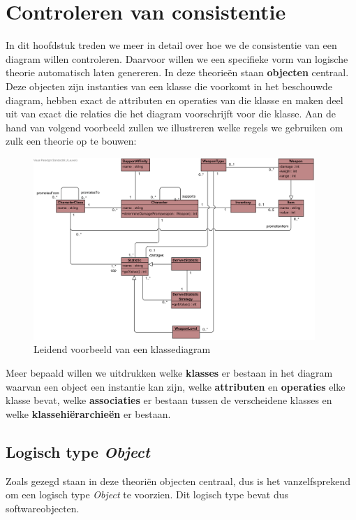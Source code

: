 \section{Controleren van consistentie}\label{sec:consistentie}
In dit hoofdstuk treden we meer in detail over hoe we de consistentie van een diagram willen controleren. Daarvoor willen we een specifieke vorm van logische theorie automatisch laten genereren. In deze theorie\"en staan \textbf{objecten} centraal. Deze objecten zijn instanties van een klasse die voorkomt in het beschouwde diagram, hebben exact de attributen en operaties van die klasse en maken deel uit van exact die relaties die het diagram voorschrijft voor die klasse. Aan de hand van volgend voorbeeld zullen we illustreren welke regels we gebruiken om zulk een theorie op te bouwen:

\begin{figure}[H]
	\label{fig:diagram-voorbeeld}
	\includegraphics[width=0.95\textwidth]{chap-consistentie/diagram-voorbeeld.png}
	\caption{Leidend voorbeeld van een klassediagram}
\end{figure}

Meer bepaald willen we uitdrukken welke \textbf{klasses} er bestaan in het diagram waarvan een object een instantie kan zijn, welke \textbf{attributen} en \textbf{operaties} elke klasse bevat, welke \textbf{associaties} er bestaan tussen de verscheidene klasses en welke \textbf{klassehi\"erarchie\"en} er bestaan.

\subsection{Logisch type \textit{Object}}
Zoals gezegd staan in deze theori\"en objecten centraal, dus is het vanzelfsprekend om een logisch type \textit{Object} te voorzien. Dit logisch type bevat dus softwareobjecten.


